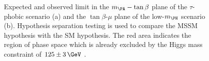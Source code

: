\begin{figure}[tbh]
\caption[Expected and observed limit in the $m_{\PA}-\tan\beta$ plane of the
$\tau$-phobic scenario (a) and the $\tan\beta$-$\mu$ plane of the low-$m_{\PH}$ scenario (b).]
{Expected and observed limit in the $m_{\PA}-\tan\beta$ plane of the
$\tau$-phobic scenario (a) and the $\tan\beta$-$\mu$ plane of the 
low-$m_{\PH}$ scenario (b). Hypothesis
separation testing is used to compare the \ac{MSSM} hypothesis with the \ac{SM}
hypothesis. The red area indicates the region of phase space which is already
excluded by the Higgs mass constraint of $125\pm3\,\GeV$ \cite{HIG-13-021}.}
\label{fig:tauphobiclowmH}
\end{figure}
